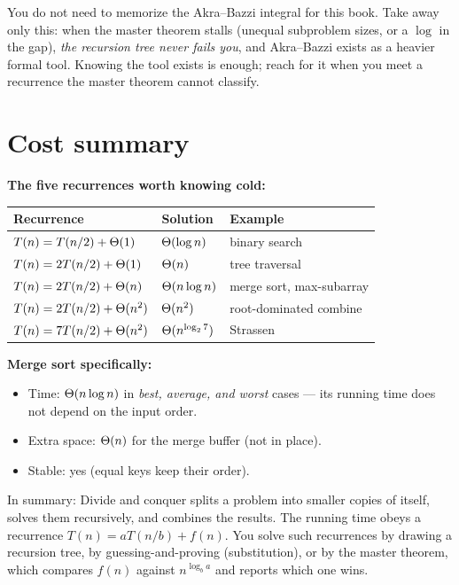 \begin{focusbox}
You do not need to memorize the Akra--Bazzi integral for this book. Take away only
this: when the master theorem stalls (unequal subproblem sizes, or a $\log$ in the
gap), \emph{the recursion tree never fails you}, and Akra--Bazzi exists as a
heavier formal tool. Knowing the tool exists is enough; reach for it when you meet
a recurrence the master theorem cannot classify.
\end{focusbox}

\section{Cost summary}

\begin{complexitybox}
\textbf{The five recurrences worth knowing cold:}
\begin{center}
\begin{tabular}{lll}
\toprule
Recurrence & Solution & Example \\
\midrule
$T(n)=T(n/2)+\Theta(1)$   & $\Theta(\log n)$        & binary search \\
$T(n)=2T(n/2)+\Theta(1)$  & $\Theta(n)$             & tree traversal \\
$T(n)=2T(n/2)+\Theta(n)$  & $\Theta(n\log n)$       & merge sort, max-subarray \\
$T(n)=2T(n/2)+\Theta(n^2)$& $\Theta(n^2)$           & root-dominated combine \\
$T(n)=7T(n/2)+\Theta(n^2)$& $\Theta(n^{\log_2 7})$  & Strassen \\
\bottomrule
\end{tabular}
\end{center}

\textbf{Merge sort specifically:}
\begin{itemize}
\item Time: $\Theta(n\log n)$ in \emph{best, average, and worst} cases ---
      its running time does not depend on the input order.
\item Extra space: $\Theta(n)$ for the merge buffer (not in place).
\item Stable: yes (equal keys keep their order).
\end{itemize}
\end{complexitybox}

\begin{recoverybox}
In summary: Divide
and conquer splits a problem into smaller copies of itself, solves them
recursively, and combines the results. The running time obeys a recurrence
$T(n)=aT(n/b)+f(n)$. You solve such recurrences by drawing a recursion tree, by
guessing-and-proving (substitution), or by the master theorem, which compares
$f(n)$ against $n^{\log_b a}$ and reports which one wins.
\end{recoverybox}

